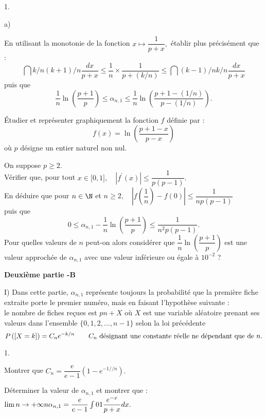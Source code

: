\documentclass[11pt]{article}%
\begin{document}
\begin{noliste}{1.}
\begin{noliste}{a)}
\item En utilisant la monotonie de la fonction $x\mapsto \dfrac{1}{p +
x},$ établir plus précisément que :
\[
\dint{k/n}{(k + 1)/n}\dfrac{dx}{p + x}\leq \dfrac{1}{n}\times 
\dfrac{1}{p + (k/n)}\leq \dint{(k-1)/n}{k/n}\dfrac{dx}{p + x}
\]
puis que 
\[
\dfrac{1}{n}\ln \left( \dfrac{p + 1}{p}\right) \leq \alpha
_{n,1}\leq \dfrac{1}{n}\ln \left( \dfrac{p + 1-(1/n)}{p-(1/n)}\right).
\]

\item Étudier et représenter graphiquement la fonction $f$ définie par
:
\[
f(x) = \ln \left( \dfrac{p + 1-x}{p-x}\right) 
\]
où $p$ désigne un entier naturel non nul.

\item On suppose $p\geq 2.$\\
Vérifier que, pour tout $x\in \lbrack 0,1],\quad \left| f^{\prime
}(x)\right| \leq \dfrac{1}{p(p-1)}.$\\
En déduire que pour $n\in \N$ et $n\geq 2,\quad \left|
f(\dfrac{1}{n})-f(0)\right| \leq \dfrac{1}{np(p-1)}$\\
puis que 
\[
0\leq \alpha_{n,1}-\dfrac{1}{n}\ln \left( \dfrac{p + 1}{p}\right)
\leq \dfrac{1}{n^{2}p(p-1)}.
\]
Pour quelles valeurs de $n$ peut-on alors considérer que
$\dfrac{1}{n}\ln
\left( \dfrac{p + 1}{p}\right) $ est une valeur approchée de
$\alpha_{n,1}$
avec une valeur inférieure ou égale à $10^{-2}$ ?
\end{noliste}
\end{noliste}

\begin{center}
\textbf{Deuxième partie -B}
\end{center}

I) Dans cette partie, $\alpha_{n,1}$ représente toujours la probabilité
que
la première fiche extraite porte le premier numéro, mais en faisant
l'hypothèse suivante :\\
le nombre de fiches reçues est $pn + X$ où $X$ est une variable
aléatoire
prenant ses valeurs dans l'ensemble $\{0,1,2,...,n-1\}$ selon la loi
précédente
\[
P\left(\left[ {X = k} \right]\right) = C_{n}e^{-k/n}\qquad C_{n}\text{ désignant
une constante réelle ne dépendant que de }n.
\]

\begin{noliste}{1.}
 \setlength{\itemsep}{4mm}
\item Montrer que $C_{n} = \dfrac{e}{e-1}(1-e^{-1//n}).$

\item Déterminer la valeur de $\alpha_{n,1}$ et montrer que :
$\lim{n\rightarrow + \infty }n\alpha_{n,1} =
\dfrac{e}{e-1}\int{0}{1}\dfrac{e^{-x}}{p + x}dx.$
\end{noliste}
\end{document}
